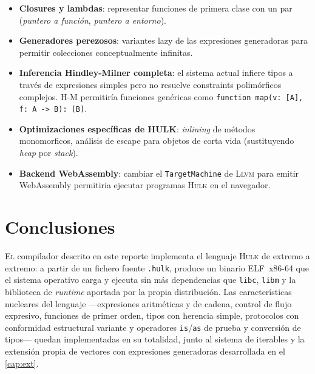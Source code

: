 \documentclass[11pt,a4paper,oneside,openany]{report}
\newcommand{\hulk}{\textsc{Hulk}}
\newcommand{\code}[1]{\texttt{#1}}
\newcommand{\llvm}{\textsc{Llvm}}
\begin{document}
\begin{itemize}
  \item \textbf{Closures y lambdas}: representar funciones de primera clase con
    un par (\textit{puntero a función}, \textit{puntero a entorno}).
  \item \textbf{Generadores perezosos}: variantes lazy de las expresiones
    generadoras para permitir colecciones conceptualmente infinitas.
  \item \textbf{Inferencia Hindley-Milner completa}: el sistema actual infiere
    tipos a través de expresiones simples pero no resuelve constraints
    polimórficos complejos. H-M permitiría funciones genéricas como
    \code{function map(v: [A], f: A -> B): [B]}.
  \item \textbf{Optimizaciones específicas de HULK}: \textit{inlining} de
    métodos monomorficos, análisis de escape para objetos de corta vida
    (sustituyendo \textit{heap} por \textit{stack}).
  \item \textbf{Backend WebAssembly}: cambiar el \code{TargetMachine} de
    \llvm{} para emitir WebAssembly permitiria ejecutar programas \hulk{} en el
    navegador.
\end{itemize}

\chapter{Conclusiones}
\label{cap:concl}

\lettrine[lines=2,findent=2pt,nindent=0pt]{E}{l} compilador descrito en este reporte
implementa el lenguaje \hulk{} de extremo a extremo: a partir de un fichero
fuente \texttt{.hulk}, produce un binario ELF~x86-64 que el sistema operativo
carga y ejecuta sin más dependencias que \code{libc}, \code{libm} y la
biblioteca de \textit{runtime} aportada por la propia distribución. Las
características nucleares del lenguaje ---expresiones aritméticas y de cadena,
control de flujo expresivo, funciones de primer orden, tipos con herencia
simple, protocolos con conformidad estructural variante y operadores
\code{is}/\code{as} de prueba y conversión de tipos--- quedan implementadas en
su totalidad, junto al sistema de iterables y la extensión propia de vectores
con expresiones generadoras desarrollada en el \cref{cap:ext}.
\end{document}
